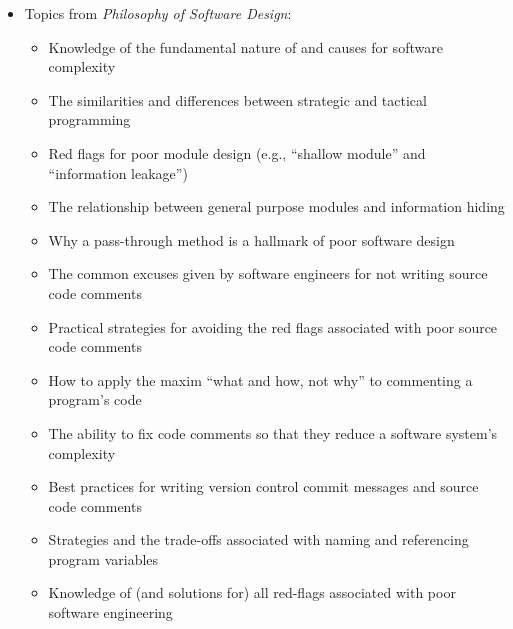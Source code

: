 \documentclass[11pt]{article}
\newcommand{\philosophy}{{\em Philosophy of Software Design\/}}
\begin{document}
\vspace*{-.05in}
\begin{itemize}

  \itemsep 0in
  \itemsep 0.05in

  \item Topics from \philosophy{}:
    \vspace*{-.05in}
    \begin{itemize}

      \itemsep 0.1in

      \item Knowledge of the fundamental nature of and causes for software
        complexity

      \item The similarities and differences between strategic and tactical
        programming

      \item Red flags for poor module design (e.g., ``shallow module'' and
        ``information leakage'')

      \item The relationship between general purpose modules and information
        hiding

      \item Why a pass-through method is a hallmark of poor software design

      \item The common excuses given by software engineers for not writing
        source code comments

      \item Practical strategies for avoiding the red flags associated with poor
        source code comments

      \item How to apply the maxim ``what and how, not why'' to commenting a
        program's code

      \item The ability to fix code comments so that they reduce a software
        system's complexity

      \item Best practices for writing version control commit messages and source code comments

      \item Strategies and the trade-offs associated with naming and referencing program variables

      \item Knowledge of (and solutions for) all red-flags associated with poor software engineering


\end{itemize}
\end{itemize}
\end{document}
